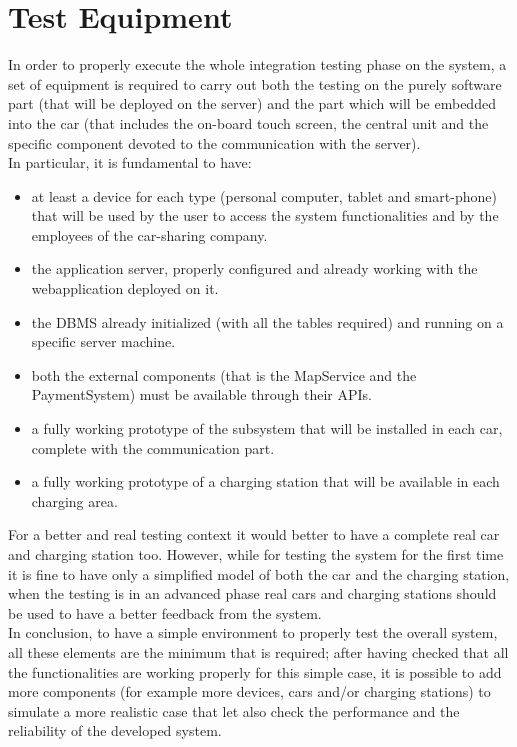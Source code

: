 \documentclass[11pt,a4paper]{report}
\begin{document}
\section{Test Equipment}
In order to properly execute the whole integration testing phase on the system, a set of equipment is required to carry out both the testing on the purely software part (that will be deployed on the server) and the part which will be embedded into the car (that includes the on-board touch screen, the central unit and the specific component devoted to the communication with the server). \\
In particular, it is fundamental to have:
\begin{itemize}
	\item at least a device for each type (personal computer, tablet and smart-phone) that will be used by the user to access the system  functionalities and by the employees of the car-sharing company.
	\item the application server, properly configured and already working with the webapplication deployed on it.
	\item the DBMS already initialized (with all the tables required) and running on a specific server machine.
	\item both the external components (that is the MapService and the PaymentSystem) must be available through their APIs.
	\item a fully working prototype of the subsystem that will be installed in each car, complete with the communication part.
	\item a fully working prototype of a charging station that will be available in each charging area.
\end{itemize}
For a better and real testing context it would better to have a complete real car and charging station too. However, while for testing the system for the first time it is fine to have only a simplified model of both the car and the  charging station, when the testing is in an advanced phase real cars and charging stations should be used to have a better feedback from the system.\\
In conclusion, to have a simple environment to properly test the overall system, all these elements are the minimum that is required; after having checked that all the functionalities are working properly for this simple case, it is possible to add more components (for example more devices, cars and/or charging stations) to simulate a more realistic case that let also check the performance and the reliability of the developed system.
\end{document}
